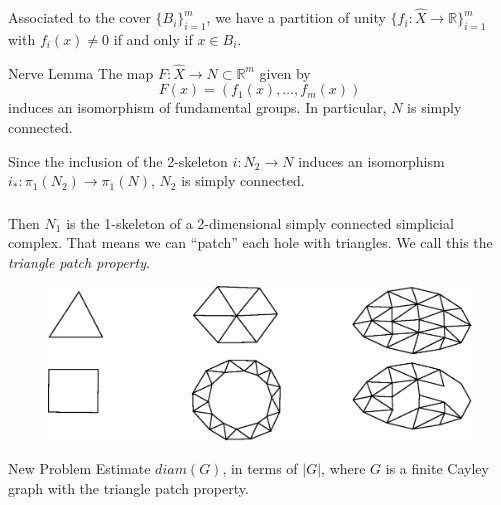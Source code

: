 \documentclass{beamer}
\begin{document}
\begin{frame}\frametitle{}

Associated to the cover $\{ B_i \}_{i=1}^m$, we have a partition of unity $\{ f_i  \colon \hat{X} \rightarrow \mathbb{R} \}_{i=1}^m $ with $f_i (x) \neq 0 $ if and only if $x \in B_i$.

\bigskip
\pause

\begin{block}{Nerve Lemma}
{The map $F \colon \hat{X} \rightarrow N \subset \mathbb{R}^m$ given by 
$$ F(x) = (f_1(x), \ldots , f_m(x)) $$
 induces an isomorphism of fundamental groups. In particular, $N$ is simply connected.
 }
\end{block}
\bigskip

\pause

Since the inclusion of the 2-skeleton $i \colon N_2 \rightarrow N$ induces an isomorphism $i_{\ast}\colon \pi_1( N_2) \rightarrow \pi_1( N)$, $N_2$ is simply connected.  


\end{frame}



\begin{frame}\frametitle{}

Then $N_1$ is the 1-skeleton of a 2-dimensional simply connected simplicial complex. That means we can ``patch'' each hole with triangles. We call this the \textit{triangle patch property}.


\begin{figure}
\centering
\includegraphics[scale=0.4]{SCGraphs.eps}
\end{figure}
\pause

\begin{block}{New Problem}
{Estimate $diam(G)$, in terms of $\vert G \vert$, where $G$ is a finite Cayley graph with the triangle patch property.
 }
\end{block}

\end{frame}
\end{document}
